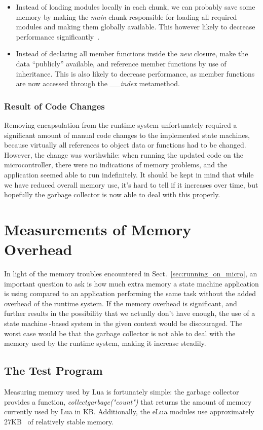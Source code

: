 \begin{itemize}
	\item Instead of loading modules locally in each chunk, we can probably save some memory by making the \emph{main} chunk responsible for loading all required modules and making them globally available. This however likely to decrease performance significantly~\cite[Ch. 2]{book:lua_programming_gems}.
	\item Instead of declaring all member functions inside the \emph{new} closure, make the data ``publicly'' available, and reference member functions by use of inheritance. This is also likely to decrease performance, as member functions are now accessed through the \emph{\_\_index} metamethod.
\end{itemize}

\subsubsection{Result of Code Changes}
Removing encapsulation from the runtime system unfortunately required a significant amount of manual code changes to the implemented state machines, because virtually all references to object data or functions had to be changed. However, the change was worthwhile: when running the updated code on the microcontroller, there were no indications of memory problems, and the application seemed able to run indefinitely. It should be kept in mind that while we have reduced overall memory use, it's hard to tell if it increases over time, but hopefully the garbage collector is now able to deal with this properly.

\section{Measurements of Memory Overhead}
\label{sec:memory_overhead_measure}
In light of the memory troubles encountered in Sect.~\ref{sec:running_on_micro}, an important question to ask is how much extra memory a state machine application is using compared to an application performing the same task without the added overhead of the runtime system. If the memory overhead is significant, and further results in the possibility that we actually don't have enough, the use of a state machine -based system in the given context would be discouraged. The worst case would be that the garbage collector is not able to deal with the memory used by the runtime system, making it increase steadily.

\subsection{The Test Program}
\label{sec:test_program}
Measuring memory used by Lua is fortunately simple: the garbage collector provides a function, \emph{collectgarbage("count")} that returns the amount of memory currently used by Lua in KB. Additionally, the eLua modules use approximately 27KB~\cite{} of relatively stable memory.

